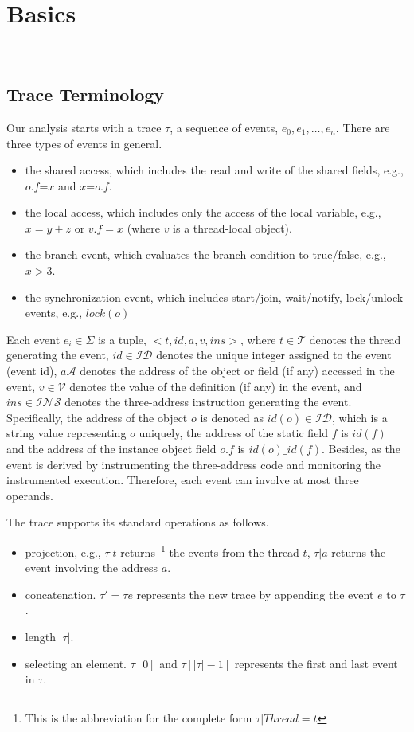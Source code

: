 \section{Basics}~\label{sec:basic}


\subsection{Trace Terminology}
Our analysis starts with a trace $\tau$,  a sequence of events, $e_0, e_1, \dots, e_n$.  
There are three types of events in general.
\begin{itemize}
\item the shared access, which includes the read and write of the shared fields, e.g., $o.f$=$x$ and $x$=$o.f$.
\item the local access, which includes only the access of the local variable, e.g., $x=y+z$ or $v.f=x$ (where $v$ is a thread-local object).
\item the branch event, which evaluates the branch condition to true/false, e.g., $x>3$.
\item the synchronization event, which includes start/join, wait/notify, lock/unlock events, e.g., $lock(o)$
\end{itemize}



Each event $e_i \in \Sigma$ is a tuple, $<t, id, a, v, ins>$, where $t\in \mathcal{T}$ denotes the thread generating the event, $id\in \mathcal{ID}$ denotes the unique integer assigned to the event (event id), $a\mathcal{A}$ denotes the address of the object or field (if any) accessed in the event,  $v\in \mathcal{V}$ denotes the value of the definition (if any) in the event, and $ins\in \mathcal{INS}$ denotes the three-address instruction generating the event.  Specifically, the address of the object $o$ is denoted as $id(o)\in \mathcal{ID}$, which is a string value representing $o$ uniquely, the address of the static field $f$ is  $id(f)$ and the address of the instance object field $o.f$ is  $id(o)\_id(f)$. Besides, as the event is derived by instrumenting the three-address code and monitoring the instrumented execution. Therefore, each event can involve at most three operands. 


The trace supports its standard operations as follows.
\begin{itemize}
\item projection, e.g., $\tau|t$ returns~\footnote{This is the abbreviation for the complete form $\tau|Thread=t$ } the events from the thread $t$,  $\tau|a$ returns the event involving the address $a$.  
\item concatenation. $\tau'=\tau e$ represents the new trace by appending the event $e$ to $\tau$.
\item length $|\tau|$. 
\item selecting an element. $\tau[0]$ and $\tau[|\tau|-1]$ represents the first and last event in $\tau$.
\end{itemize}


